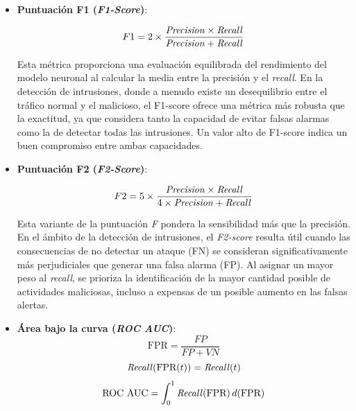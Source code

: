 \begin{itemize}
\item \textbf{Puntuación F1 (\textit{F1-Score})}: \label{met:F1-score}

\begin{equation}
    F1 = 2 \times \frac{\text{\textit{Precision}} \times \text{\textit{Recall}}}{\text{\textit{Precision}} + \text{\textit{Recall}}}
\end{equation}

Esta métrica proporciona una evaluación equilibrada del rendimiento del modelo neuronal al calcular la media entre la precisión y el \textit{recall}. En la detección de intrusiones, donde a menudo existe un desequilibrio entre el tráfico normal y el malicioso, el F1-score ofrece una métrica más robusta que la exactitud, ya que considera tanto la capacidad de evitar falsas alarmas como la de detectar todas las intrusiones. Un valor alto de F1-score indica un buen compromiso entre ambas capacidades.

\item \textbf{Puntuación F2 (\textit{F2-Score})}: \label{met:F2-score}

\begin{equation}
    F2 = 5 \times \frac{\text{\textit{Precision}} \times \text{\textit{Recall}}}{4 \times \text{\textit{Precision}} + \text{\textit{Recall}}}
\end{equation}

Esta variante de la puntuación \textit{F} pondera la sensibilidad más que la precisión. En el ámbito de la detección de intrusiones, el \textit{F2-score} resulta útil cuando las consecuencias de no detectar un ataque (FN) se consideran significativamente más perjudiciales que generar una falsa alarma (FP). Al asignar un mayor peso al \textit{recall}, se prioriza la identificación de la mayor cantidad posible de actividades maliciosas, incluso a expensas de un posible aumento en las falsas alertas.


\item \textbf{Área bajo la curva (\textit{ROC AUC})}: \label{met:ROCAUC}
\begin{equation}
    \text{FPR} = \frac{FP}{FP + VN}
\end{equation}
\begin{equation}
    \text{\textit{Recall}}(\text{FPR}(t)) = \text{\textit{Recall}}(t)
\end{equation}
\begin{equation}
    \text{ROC AUC} = \int_{0}^{1} \text{\textit{Recall}}(\text{FPR}) \, d(\text{FPR})
\end{equation}




\end{itemize}
